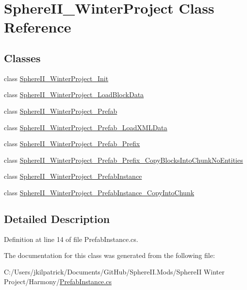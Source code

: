 \hypertarget{class_sphere_i_i___winter_project}{}\section{Sphere\+I\+I\+\_\+\+Winter\+Project Class Reference}
\label{class_sphere_i_i___winter_project}
\subsection*{Classes}
\begin{DoxyCompactItemize}
\item 
class \mbox{\hyperlink{class_sphere_i_i___winter_project_1_1_sphere_i_i___winter_project___init}{Sphere\+I\+I\+\_\+\+Winter\+Project\+\_\+\+Init}}
\item 
class \mbox{\hyperlink{class_sphere_i_i___winter_project_1_1_sphere_i_i___winter_project___load_block_data}{Sphere\+I\+I\+\_\+\+Winter\+Project\+\_\+\+Load\+Block\+Data}}
\item 
class \mbox{\hyperlink{class_sphere_i_i___winter_project_1_1_sphere_i_i___winter_project___prefab}{Sphere\+I\+I\+\_\+\+Winter\+Project\+\_\+\+Prefab}}
\item 
class \mbox{\hyperlink{class_sphere_i_i___winter_project_1_1_sphere_i_i___winter_project___prefab___load_x_m_l_data}{Sphere\+I\+I\+\_\+\+Winter\+Project\+\_\+\+Prefab\+\_\+\+Load\+X\+M\+L\+Data}}
\item 
class \mbox{\hyperlink{class_sphere_i_i___winter_project_1_1_sphere_i_i___winter_project___prefab___prefix}{Sphere\+I\+I\+\_\+\+Winter\+Project\+\_\+\+Prefab\+\_\+\+Prefix}}
\item 
class \mbox{\hyperlink{class_sphere_i_i___winter_project_1_1_sphere_i_i___winter_project___prefab___prefix___copy_blocks_into_chunk_no_entities}{Sphere\+I\+I\+\_\+\+Winter\+Project\+\_\+\+Prefab\+\_\+\+Prefix\+\_\+\+Copy\+Blocks\+Into\+Chunk\+No\+Entities}}
\item 
class \mbox{\hyperlink{class_sphere_i_i___winter_project_1_1_sphere_i_i___winter_project___prefab_instance}{Sphere\+I\+I\+\_\+\+Winter\+Project\+\_\+\+Prefab\+Instance}}
\item 
class \mbox{\hyperlink{class_sphere_i_i___winter_project_1_1_sphere_i_i___winter_project___prefab_instance___copy_into_chunk}{Sphere\+I\+I\+\_\+\+Winter\+Project\+\_\+\+Prefab\+Instance\+\_\+\+Copy\+Into\+Chunk}}
\end{DoxyCompactItemize}


\subsection{Detailed Description}


Definition at line 14 of file Prefab\+Instance.\+cs.



The documentation for this class was generated from the following file\+:\begin{DoxyCompactItemize}
\item 
C\+:/\+Users/jkilpatrick/\+Documents/\+Git\+Hub/\+Sphere\+I\+I.\+Mods/\+Sphere\+I\+I Winter Project/\+Harmony/\mbox{\hyperlink{_prefab_instance_8cs}{Prefab\+Instance.\+cs}}\end{DoxyCompactItemize}
